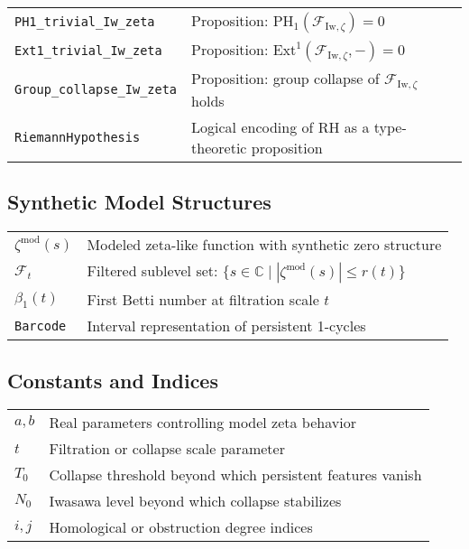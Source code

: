\documentclass[11pt]{article}
\begin{document}
\begin{tabular}{ll}
\texttt{PH1\_trivial\_Iw\_zeta} & Proposition: $\mathrm{PH}_1(\mathcal{F}_{\mathrm{Iw}, \zeta}) = 0$ \\
\texttt{Ext1\_trivial\_Iw\_zeta} & Proposition: $\mathrm{Ext}^1(\mathcal{F}_{\mathrm{Iw}, \zeta}, -) = 0$ \\
\texttt{Group\_collapse\_Iw\_zeta} & Proposition: group collapse of $\mathcal{F}_{\mathrm{Iw}, \zeta}$ holds \\
\texttt{RiemannHypothesis} & Logical encoding of RH as a type-theoretic proposition \\
\end{tabular}

\subsection*{Synthetic Model Structures}

\begin{tabular}{ll}
$\zeta^{\mathrm{mod}}(s)$ & Modeled zeta-like function with synthetic zero structure \\
$\mathcal{F}_t$ & Filtered sublevel set: $\{ s \in \mathbb{C} \mid |\zeta^{\mathrm{mod}}(s)| \leq r(t) \}$ \\
$\beta_1(t)$ & First Betti number at filtration scale $t$ \\
\texttt{Barcode} & Interval representation of persistent 1-cycles \\
\end{tabular}

\subsection*{Constants and Indices}

\begin{tabular}{ll}
$a, b$ & Real parameters controlling model zeta behavior \\
$t$ & Filtration or collapse scale parameter \\
$T_0$ & Collapse threshold beyond which persistent features vanish \\
$N_0$ & Iwasawa level beyond which collapse stabilizes \\
$i, j$ & Homological or obstruction degree indices \\
\end{tabular}



\end{document}
